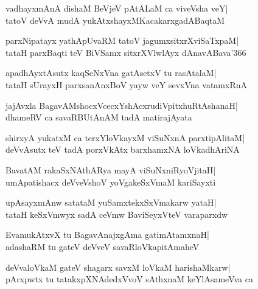\documentclass[twoside,12pt,openright]{book}
\newcounter{shloka}[chapter]
\begin{document}
\begin{shloka}%
vadhayxmAnA dishaM BeVjeV pAtALaM ca viveVsha veY|\\
tatoV deVvA mudA yukAtxshayxMKacakarxgadABaqtaM
\end{shloka}

\begin{shloka}%
parxNipatayx yathApUvaRM tatoV jagumxsitxrXviSaTxpaM|\\
tataH parxBaqti teV BiVSamx sitxrXVlwlAyx dAnavABava\char'366
\end{shloka}

\begin{shloka}%
apadhAyxtAsutx kaqSeNxVna gatAsetxV tu rasAtalaM|\\
tataH sUrayxH parxsanAnxBoV yayw veY sevxVna vatamxRnA
\end{shloka}

\begin{shloka}%
jajAvxla BagavAMshocxVcecxYshAcxrudiVpitxhuRtAshanaH|\\
dhameRV ca savaRBUtAnAM tadA matirajAyata
\end{shloka}

\begin{shloka}%
shirxyA yukatxM ca terxYloVkayxM viSuNxnA parxtipAlitaM|\\
deVvAsutx teV tadA porxVkAtx barxhamxNA loVkadhAriNA
\end{shloka}

\begin{shloka}%
BavatAM rakaSxNAthARya mayA viSuNxniRyoVjitaH|\\
umApatishacx deVveVshoV yoVgakeSxVmaM kariSayxti
\end{shloka}

\begin{shloka}%
upAsayxmAnw satataM yuSamxtekxSxVmakarw yataH|\\
tataH keSxVmwyx sadA ceVmw BaviSeyxVteV varaparxdw
\end{shloka}

\begin{shloka}%
EvamukAtxvX tu BagavAnajxgAma gatimAtamxnaH|\\
adashaRM tu gateV deVveV savaRloVkapitAmaheV
\end{shloka}

\begin{shloka}%
deVvaloVkaM gateV shagarx savxM loVkaM harishaMkarw|\\
pArxpwtx tu tatakxpXNAdedxVvoV sAthxnaM keYlAsameVva ca
\end{shloka}
\end{document}
